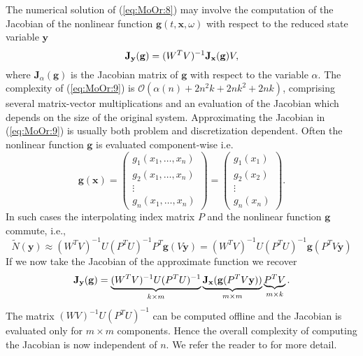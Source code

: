 {\edit The numerical solution of (\ref{eq:MoOr:8}) may involve the computation of the Jacobian of the nonlinear function $\mathbf g(t,\mathbf x, \omega)$ with respect to the reduced state variable $\mathbf y$}
\begin{equation} \label{eq:MoOr:9}
	\edit \mathbf J_{\mathbf y}(\mathbf g) = (W^TV)^{-1} \mathbf J_{\mathbf x}(\mathbf g) V,
\end{equation}
{\edit where $\mathbf J_\alpha(\mathbf g)$ is the Jacobian matrix of $\mathbf g$ with respect to the variable $\alpha$.} The complexity of (\ref{eq:MoOr:9}) is $\mathcal{O}(\alpha(n) +2n^2k+2nk^2+2nk)$, comprising several matrix-vector multiplications and an evaluation of the Jacobian which depends on the size of the original system. Approximating the Jacobian in (\ref{eq:MoOr:9}) is usually both problem and discretization dependent. Often the nonlinear function $\mathbf g$ is evaluated component-wise i.e.
\begin{equation} \label{eq:MoOr:15}
	\mathbf g(\mathbf x) =
	\begin{pmatrix}
		g_1(x_1,\dots,x_n) \\
		g_2(x_1,\dots,x_n) \\
		\vdots \\
		g_n(x_1,\dots,x_n)
	\end{pmatrix}
	=
	\begin{pmatrix}
		g_1(x_1) \\
		g_2(x_2) \\
		\vdots \\
		g_n(x_n)
	\end{pmatrix}.
\end{equation}
In such cases the interpolating index matrix $P$ and the nonlinear function $\mathbf g$ commute, i.e.,
\begin{equation} \label{eq:MoOr:16}
	\tilde N(\mathbf y) \approx (W^TV)^{-1} U(P^TU)^{-1}P^T \mathbf g(V\mathbf y) = (W^TV)^{-1} U(P^TU)^{-1}\mathbf g(P^TV\mathbf y)
\end{equation}
If we now take the Jacobian of the approximate function we recover
\begin{equation}
	\color{black} \mathbf J_{\mathbf y}(\mathbf g) = \underbrace{ (W^TV)^{-1} U(P^TU)^{-1} }_{k\times m} \underbrace{ \mathbf J_{\mathbf x}(\mathbf g(P^T V \mathbf y) ) }_{m\times m} \underbrace{P^T V}_{m\times k}.
\end{equation}
The matrix $(WV)^{-1} U(P^TU)^{-1}$ can be computed offline and the Jacobian is evaluated only for $m\times m$ components. Hence the overall complexity of computing the Jacobian is now independent of $n$. {\edit We refer the reader to \cite{Barrault:2004kz,Chaturantabut:2010cz} for more detail.}
